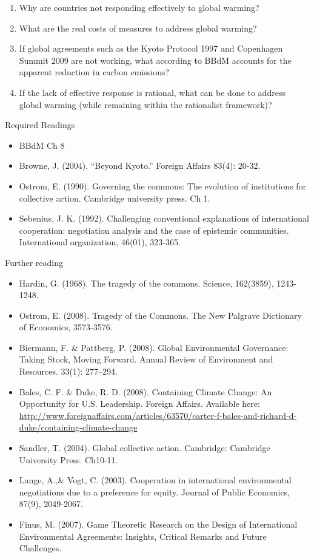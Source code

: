 \documentclass[12pt,a4paper]{article}
\begin{document}
\begin{enumerate}
	\item Why are countries not responding effectively to global warming?
	\item What are the real costs of measures to address global warming?
	\item If global agreements such as the Kyoto Protocol 1997 and Copenhagen Summit 2009 are not working, what according to BBdM accounts for the apparent reduction in carbon emissions?
	\item If the lack of effective response is rational, what can be done to address global warming (while remaining within the rationalist framework)?
\end{enumerate}

\noindent Required Readings

\begin{itemize}
	\item BBdM Ch 8
	\item Browne, J. (2004). “Beyond Kyoto.” Foreign Affairs 83(4): 20-32.
	\item Ostrom, E. (1990). Governing the commons: The evolution of institutions for collective action. Cambridge university press. Ch 1.
	\item Sebenius, J. K. (1992). Challenging conventional explanations of international cooperation: negotiation analysis and the case of epistemic communities. International organization, 46(01), 323-365.
\end{itemize}

\noindent Further reading

\begin{itemize}
	\item Hardin, G. (1968). The tragedy of the commons. Science, 162(3859), 1243-1248.
	\item Ostrom, E. (2008). Tragedy of the Commons. The New Palgrave Dictionary of Economics, 3573-3576.
	\item Biermann, F. \& Pattberg, P. (2008). Global Environmental Governance: Taking Stock, Moving Forward. Annual Review of Environment and Resources. 33(1): 277--294.
	\item Bales, C. F. \& Duke, R. D. (2008). Containing Climate Change: An Opportunity for U.S. Leadership. Foreign Affairs. Available here: \url{http://www.foreignaffairs.com/articles/63570/carter-f-bales-and-richard-d-duke/containing-climate-change}
	\item Sandler, T. (2004). Global collective action. Cambridge: Cambridge University Press. Ch10-11.
	\item Lange, A.,\& Vogt, C. (2003). Cooperation in international environmental negotiations due to a preference for equity. Journal of Public Economics, 87(9), 2049-2067.
	\item Finus, M. (2007). Game Theoretic Research on the Design of International Environmental Agreements: Insights, Critical Remarks and Future Challenges.
\end{itemize}
\end{document}
